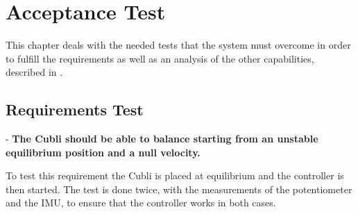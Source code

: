 \chapter{Acceptance Test}
This chapter deals with the needed tests that the system must overcome in order to fulfill the requirements as well as an analysis of the other capabilities, described in .

\section{Requirements Test}

- \textbf{The Cubli should be able to balance starting from an unstable equilibrium position and a null velocity.}

To test this requirement the Cubli is placed at equilibrium and the controller is then started. The test is done twice, with the measurements of the potentiometer and the IMU, to ensure that the controller works in both cases.

